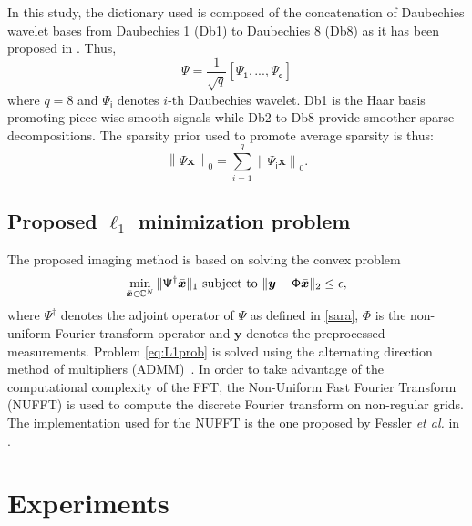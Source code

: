 \documentclass[conference]{IEEEtran}
\newcommand{\etal}{\textit{et al.}}
\begin{document}
In this study, the dictionary used is composed of the concatenation of Daubechies wavelet bases from Daubechies 1 (Db1) to Daubechies 8 (Db8) as it has been proposed in \cite{Carrillo_SPL_2013}. Thus,
\begin{equation}\label{sara}
\mathsf{\Psi} = \frac{1}{\sqrt{q}} [\mathsf{\Psi_{1}},...,\mathsf{\Psi_{q}}]
\end{equation}
where $q=8$ and $\mathsf{\Psi_i}$ denotes $i$-th Daubechies wavelet. Db1 is the Haar basis promoting piece-wise smooth signals while Db2 to Db8 provide smoother sparse decompositions. The sparsity prior used to promote average sparsity is thus:
\begin{equation}
\left\lVert \mathsf{\Psi} \bm{x} \right\lVert_0 = \sum_{i = 1}^q \left\lVert \mathsf{\Psi_i} \bm{x} \right\lVert_0.
\end{equation}

\subsection{Proposed $\ell_1$ minimization problem}
The proposed imaging method is based on solving the convex problem
\begin{equation}
\label{eq:L1prob}
\min_{\bar{\bm{x}}\in\mathbb{C}^{N}}\|\mathsf{\Psi}^{\dagger}\bar{\bm{x}}\|_{1}
\textnormal{ subject to }\| \bm{y}-\mathsf{\Phi}\bar{\bm{x}}\|_{2}\leq\epsilon,
\end{equation}
%
where $\mathsf{\Psi}^{\dagger}$ denotes the adjoint operator of $\mathsf{\Psi}$ as defined in \eqref{sara}, $\mathsf{\Phi}$ is the non-uniform Fourier transform operator and $\bm{y}$ denotes the preprocessed measurements.  Problem \eqref{eq:L1prob} is solved using the alternating direction method of multipliers (ADMM)~\cite{yang11}. In order to take advantage of the computational complexity of the FFT, the Non-Uniform Fast Fourier Transform (NUFFT) is used to compute the discrete Fourier transform on non-regular grids. The implementation used for the NUFFT is the one proposed by Fessler \etal{} in \cite{Fessler_TSP_2003}. 

\section{Experiments}
\label{sec:Exp}
\end{document}
